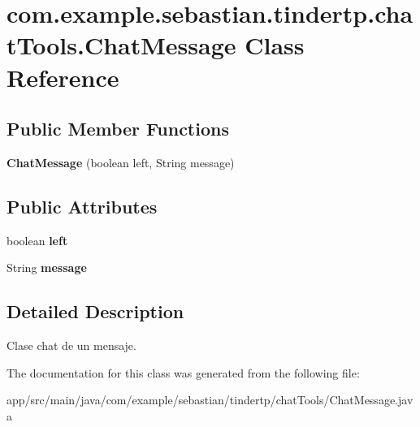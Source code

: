 \hypertarget{classcom_1_1example_1_1sebastian_1_1tindertp_1_1chatTools_1_1ChatMessage}{}\section{com.\+example.\+sebastian.\+tindertp.\+chat\+Tools.\+Chat\+Message Class Reference}
\label{classcom_1_1example_1_1sebastian_1_1tindertp_1_1chatTools_1_1ChatMessage}
\subsection*{Public Member Functions}
\begin{DoxyCompactItemize}
\item 
{\bfseries Chat\+Message} (boolean left, String message)\hypertarget{classcom_1_1example_1_1sebastian_1_1tindertp_1_1chatTools_1_1ChatMessage_ac0b763b632fde85f61521a2fbdff51eb}{}\label{classcom_1_1example_1_1sebastian_1_1tindertp_1_1chatTools_1_1ChatMessage_ac0b763b632fde85f61521a2fbdff51eb}

\end{DoxyCompactItemize}
\subsection*{Public Attributes}
\begin{DoxyCompactItemize}
\item 
boolean {\bfseries left}\hypertarget{classcom_1_1example_1_1sebastian_1_1tindertp_1_1chatTools_1_1ChatMessage_a82d79bdbea3d10a7871db563a03d94ab}{}\label{classcom_1_1example_1_1sebastian_1_1tindertp_1_1chatTools_1_1ChatMessage_a82d79bdbea3d10a7871db563a03d94ab}

\item 
String {\bfseries message}\hypertarget{classcom_1_1example_1_1sebastian_1_1tindertp_1_1chatTools_1_1ChatMessage_aee5e1e99652c0f954aec7f99975c2714}{}\label{classcom_1_1example_1_1sebastian_1_1tindertp_1_1chatTools_1_1ChatMessage_aee5e1e99652c0f954aec7f99975c2714}

\end{DoxyCompactItemize}


\subsection{Detailed Description}
Clase chat de un mensaje. 

The documentation for this class was generated from the following file\+:\begin{DoxyCompactItemize}
\item 
app/src/main/java/com/example/sebastian/tindertp/chat\+Tools/Chat\+Message.\+java\end{DoxyCompactItemize}
